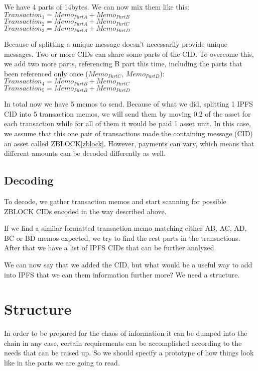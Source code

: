 \documentclass[10pt,a4paper]{paper}
\begin{document}
	We have 4 parts of 14bytes. We can now mix them like this:\\
	$Transaction_{1} = Memo_{PartA}+Memo_{PartB}$\\
	$Transaction_{2} = Memo_{PartA}+Memo_{PartC}$\\
	$Transaction_{3} = Memo_{PartA}+Memo_{PartD}$

	Because of splitting a unique message doesn't necessarily provide unique messages. Two or more CIDs can share some parts of the CID. To overcome this, we add two more parts, referencing B part this time, including the parts that been referenced only once ($Memo_{PartC}$, $Memo_{PartD}$):\\
	$Transaction_{4} = Memo_{PartB}+Memo_{PartC}$\\
	$Transaction_{5} = Memo_{PartB}+Memo_{PartD}$
	
	In total now we have 5 memos to send. Because of what we did, splitting 1 IPFS CID into 5 transaction memos, we will send them by moving 0.2 of the asset for each transaction while for all of them it would be paid 1 asset unit. In this case, we assume that this one pair of transactions made the containing message (CID) an asset called ZBLOCK\ref{zblock}. However, payments can vary, which means that different amounts can be decoded differently as well.
	
	
	\subsection{Decoding}\label{decoding}
	
	To decode, we gather transaction memos and start scanning for possible ZBLOCK CIDs encoded in the way described above.
	
	If we find a similar formatted transaction memo matching either AB, AC, AD, BC or BD memos expected, we try to find the rest parts in the transactions. After that we have a list of IPFS CIDs that can be further analyzed.
	
	We can now say that we added the CID, but what would be a useful way to add into IPFS that we can them information further more? We need a structure.
	
	\section{Structure}\label{structure}

	In order to be prepared for the chaos of information it can be dumped into the chain in any case, certain requirements can be accomplished according to the needs that can be raised up. So we should specify a prototype of how things look like in the parts we are going to read.
	
\end{document}
